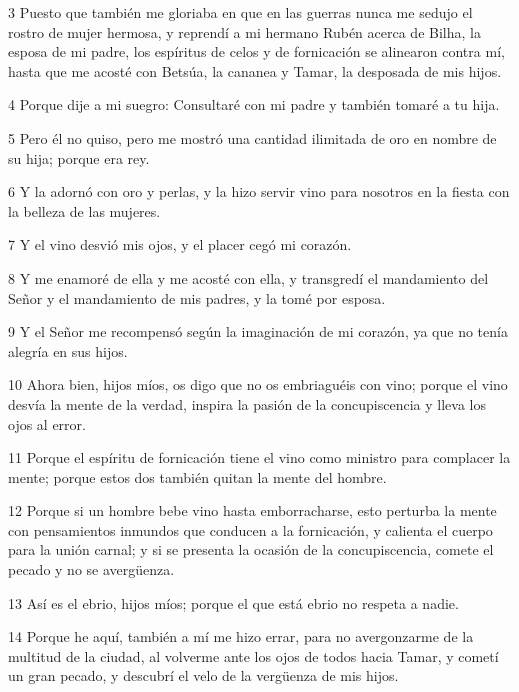 \par 3 Puesto que también me gloriaba en que en las guerras nunca me sedujo el rostro de mujer hermosa, y reprendí a mi hermano Rubén acerca de Bilha, la esposa de mi padre, los espíritus de celos y de fornicación se alinearon contra mí, hasta que me acosté con Betsúa, la cananea y Tamar, la desposada de mis hijos.

\par 4 Porque dije a mi suegro: Consultaré con mi padre y también tomaré a tu hija.

\par 5 Pero él no quiso, pero me mostró una cantidad ilimitada de oro en nombre de su hija; porque era rey.

\par 6 Y la adornó con oro y perlas, y la hizo servir vino para nosotros en la fiesta con la belleza de las mujeres.

\par 7 Y el vino desvió mis ojos, y el placer cegó mi corazón.

\par 8 Y me enamoré de ella y me acosté con ella, y transgredí el mandamiento del Señor y el mandamiento de mis padres, y la tomé por esposa.

\par 9 Y el Señor me recompensó según la imaginación de mi corazón, ya que no tenía alegría en sus hijos.

\par 10 Ahora bien, hijos míos, os digo que no os embriaguéis con vino; porque el vino desvía la mente de la verdad, inspira la pasión de la concupiscencia y lleva los ojos al error.

\par 11 Porque el espíritu de fornicación tiene el vino como ministro para complacer la mente; porque estos dos también quitan la mente del hombre.

\par 12 Porque si un hombre bebe vino hasta emborracharse, esto perturba la mente con pensamientos inmundos que conducen a la fornicación, y calienta el cuerpo para la unión carnal; y si se presenta la ocasión de la concupiscencia, comete el pecado y no se avergüenza.

\par 13 Así es el ebrio, hijos míos; porque el que está ebrio no respeta a nadie.

\par 14 Porque he aquí, también a mí me hizo errar, para no avergonzarme de la multitud de la ciudad, al volverme ante los ojos de todos hacia Tamar, y cometí un gran pecado, y descubrí el velo de la vergüenza de mis hijos.

